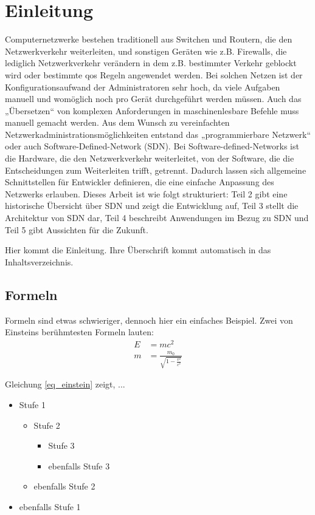 \documentclass[twoside,12pt]{scrartcl}
\begin{document}
	\section{Einleitung}
	Computernetzwerke bestehen traditionell aus Switchen und Routern, die den Netzwerkverkehr weiterleiten, und sonstigen Geräten wie z.B. Firewalls, die lediglich Netzwerkverkehr verändern in dem z.B. bestimmter Verkehr geblockt wird oder bestimmte qos Regeln angewendet werden. Bei solchen Netzen ist der Konfigurationsaufwand der Administratoren sehr hoch, da viele Aufgaben manuell und womöglich noch pro Gerät durchgeführt werden müssen. Auch das „Übersetzen“ von komplexen Anforderungen in maschinenlesbare Befehle muss manuell gemacht werden.
Aus dem Wunsch zu vereinfachten Netzwerkadministrationsmöglichkeiten entstand das „programmierbare Netzwerk“ oder auch Software-Defined-Network (SDN). Bei Software-defined-Networks ist die Hardware, die den Netzwerkverkehr weiterleitet, von der Software, die die Entscheidungen zum Weiterleiten trifft, getrennt. Dadurch lassen sich allgemeine Schnittstellen für Entwickler definieren, die eine einfache Anpassung des Netzwerks erlauben.
Dieses Arbeit ist wie folgt strukturiert: Teil 2 gibt eine historische Übersicht über SDN und zeigt die Entwicklung auf, Teil 3 stellt die Architektur von SDN dar, Teil 4 beschreibt Anwendungen im Bezug zu SDN und Teil 5 gibt Aussichten für die Zukunft.

	\onehalfspacing
	
	
	Hier kommt die Einleitung. Ihre Überschrift kommt
	automatisch in das Inhaltsverzeichnis.
	
	\subsection{Formeln}
		
	Formeln sind etwas schwieriger, dennoch hier ein
	einfaches Beispiel.  Zwei von Einsteins
	berühmtesten Formeln lauten:
	\begin{align}
	E &= mc^2          \label{eq_einstein}                        \\
	m &= \frac{m_0}{\sqrt{1-\frac{v^2}{c^2}}}
	\end{align}
	
	
	Gleichung \eqref{eq_einstein} zeigt, ...
	
	\begin{itemize}
		\item Stufe 1
		\begin{itemize}
			\item Stufe 2
			\begin{itemize}
				\item Stufe 3
				\item ebenfalls Stufe 3
			\end{itemize}
			\item ebenfalls Stufe 2
		\end{itemize}
		\item ebenfalls Stufe 1
	\end{itemize}
	
\end{document}
